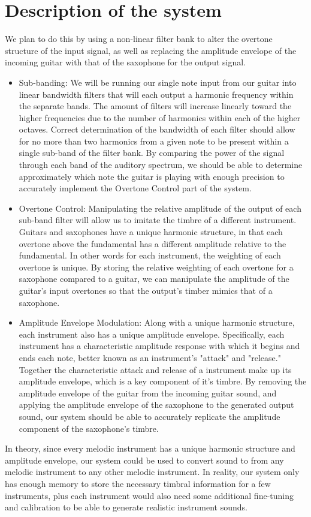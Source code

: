 \documentclass{article}
\begin{document}
\section{Description of the system}
We plan to do this by using a non-linear filter bank to alter the overtone structure of the input signal, as well as replacing the amplitude envelope of the incoming guitar with that of the saxophone for the output signal.
\begin{itemize}
 \item Sub-banding: We will be running our single note input from our guitar into linear bandwidth filters that will each output a harmonic frequency within the separate bands. The amount of filters will increase linearly toward the higher frequencies due to the number of harmonics within each of the higher octaves. Correct determination of the bandwidth of each filter should allow for no more than two harmonics from a given note to be present within a single sub-band of the filter bank. By comparing the power of the signal through each band of the auditory spectrum, we should be able to determine approximately which note the guitar is playing with enough precision to accurately implement the Overtone Control part of the system.
 
 \item Overtone Control: Manipulating the relative amplitude of the output of each sub-band filter will allow us to imitate the timbre of a different instrument. Guitars and saxophones have a unique harmonic structure, in that each overtone above the fundamental has a different amplitude relative to the fundamental. In other words for each instrument, the weighting of each overtone is unique. By storing the relative weighting of each overtone for a saxophone compared to a guitar, we can manipulate the amplitude of the guitar's input overtones so that the output's timber mimics that of a saxophone.
 
 \item Amplitude Envelope Modulation: Along with a unique harmonic structure, each instrument also has a unique amplitude envelope. Specifically, each instrument has a characteristic amplitude response with which it begins and ends each note, better known as an instrument's "attack" and "release." Together the characteristic attack and release of a instrument make up its amplitude envelope, which is a key component of it's timbre. By removing the amplitude envelope of the guitar from the incoming guitar sound, and applying the amplitude envelope of the saxophone to the generated output sound, our system should be able to accurately replicate the amplitude component of the saxophone's timbre.
 \end{itemize}
In theory, since every melodic instrument has a unique harmonic structure and amplitude envelope, our system could be used to convert sound to from any melodic instrument to any other melodic instrument. In reality, our system only has enough memory to store the necessary timbral information for a few instruments, plus each instrument would also need some additional fine-tuning and calibration to be able to generate realistic instrument sounds.
\end{document}
